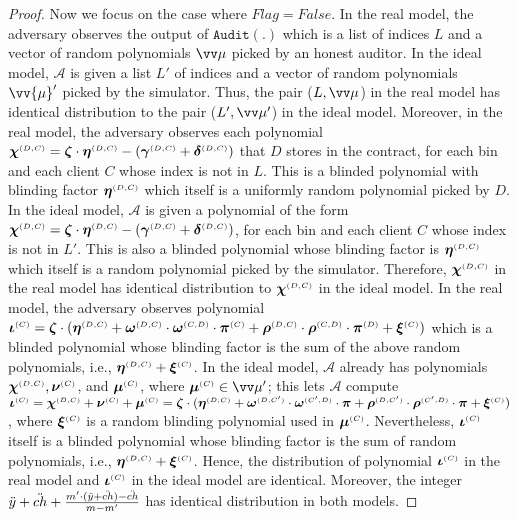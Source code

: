 \begin{proof}
Now we focus on the case where $Flag=False$.  In the real model, the adversary observes the output of $\mathtt{Audit}(.)$ which is a list of indices $  L$ and a vector of random polynomials $\vv\mu$ picked by an honest auditor.  In the ideal model, $\mathcal{A}$ is given a  list $  L'$ of indices and a vector of random polynomials $\vv{\mu}'$ picked by the simulator. Thus, the pair ($  L, \vv\mu$) in the real model has identical distribution to the pair ($  L', \vv\mu'$) in the ideal model. Moreover, in the real model, the adversary observes each polynomial $\bm\chi^{ \scriptscriptstyle {  {(D, C)}}}=\bm\zeta\cdot \bm\eta^{ \scriptscriptstyle {  {(D,C)}}}-(\bm\gamma^{ \scriptscriptstyle {  {(D,C)}}}+\bm\delta^{ \scriptscriptstyle {  {(D,C)}}})$ that $D$ stores in the contract, for each bin and each client $C$ whose index is not in $  L$. This is a blinded polynomial with blinding factor $\bm\eta^{ \scriptscriptstyle {  {(D,C)}}}$ which itself is a uniformly random polynomial picked by $D$. In the ideal model, $\mathcal{A}$ is given a polynomial of the form $ {\bm\chi}^{ \scriptscriptstyle {  {(D, C)}}}= {\bm\zeta}\cdot  {\bm\eta}^{ \scriptscriptstyle {  {(D,C)}}}-( {\bm\gamma}^{ \scriptscriptstyle {  {(D,C)}}}+ {\bm\delta}^{ \scriptscriptstyle {  {(D,C)}}})$, for each bin and each client $C$ whose index is not in $  L'$. This is also a blinded polynomial whose blinding factor is  $ {\bm\eta}^{ \scriptscriptstyle {  {(D,C)}}}$ which itself is a random polynomial picked by the simulator.  Therefore, $\bm\chi^{ \scriptscriptstyle {  {(D, C)}}}$ in the real model has  identical distribution to $\bm\chi^{ \scriptscriptstyle {  {(D, C)}}}$ in the ideal model.  In the real model, the adversary  observes polynomial $ \bm\iota^{ \scriptscriptstyle {  {(C)}}}= \bm\zeta\cdot(\bm\eta^{ \scriptscriptstyle {  {(D,C)}}} + \bm\omega^{ \scriptscriptstyle {  {(D,C)}}}\cdot \bm\omega^{ \scriptscriptstyle {  {(C,D)}}}\cdot \bm\pi^{ \scriptscriptstyle {  {(C)}}}+\bm\rho^{ \scriptscriptstyle {  {(D,C)}}}\cdot \bm\rho^{ \scriptscriptstyle {  {(C,D)}}}\cdot \bm\pi^{ \scriptscriptstyle {  {(D)}}}+\bm\xi^{ \scriptscriptstyle {  {(C)}}})$ which is a blinded polynomial whose blinding factor is the sum of the above random polynomials, i.e., $\bm\eta^{ \scriptscriptstyle {  {(D,C)}}}+\bm\xi^{ \scriptscriptstyle {  {(C)}}}$. In the ideal model, $\mathcal{A}$ already has  polynomials $ {\bm\chi}^{ \scriptscriptstyle {  {(D, C)}}},  {\bm\nu}^{ \scriptscriptstyle {  {(C)}}}$, and $ {\bm\mu}^{ \scriptscriptstyle {  {(C)}}}$, where $ {\bm\mu}^{ \st {  {(C)}}}\in {\vv \mu'}$; this lets $\mathcal{A}$ compute
 $  {\bm\iota}^{ \scriptscriptstyle {  {(C)}}} =  {\bm\chi}^{ \scriptscriptstyle {  {(D, C)}}} +   {\bm\nu}^{ \scriptscriptstyle {  {(C)}}} +  {\bm\mu}^{ \scriptscriptstyle {  {(C)}}}= {\bm\zeta}\cdot ( {\bm\eta}^{ \scriptscriptstyle {  {(D,C)}}}+  {\bm\omega}^{ \scriptscriptstyle {  {(D,C')}}}\cdot  {\bm\omega}^{ \scriptscriptstyle {  {(C',D)}}}\cdot  {\bm\pi}+  {\bm\rho}^{ \scriptscriptstyle {  {(D,C')}}}\cdot  {\bm\rho}^{ \scriptscriptstyle {  {(C',D)}}}\cdot  {\bm\pi}+ {\bm\xi}^{ \scriptscriptstyle {  {(C)}}})$,
  where $ {\bm\xi}^{ \scriptscriptstyle {  {(C)}}}$ is a random blinding polynomial used in $ {\bm\mu}^{ \scriptscriptstyle {  {(C)}}}$. Nevertheless, $ {\bm\iota}^{ \scriptscriptstyle {  {(C)}}}$ itself is a blinded polynomial whose blinding factor is the sum of random polynomials, i.e., $ {\bm\eta}^{ \scriptscriptstyle {  {(D,C)}}}+ {\bm\xi}^{ \scriptscriptstyle {  {(C)}}}$. Hence, the distribution of polynomial $ \bm\iota^{ \scriptscriptstyle {  {(C)}}}$ in the real model and $ {\bm\iota}^{ \scriptscriptstyle {  {(C)}}}$ in the ideal model are identical. Moreover, the integer $\ddot{y}+\ddot{ch}+\frac{m'\cdot (\ddot{y}+\ddot{ch})-\ddot{ch}}{m-m'}$ has identical distribution  in both  models. 


\end{proof}
